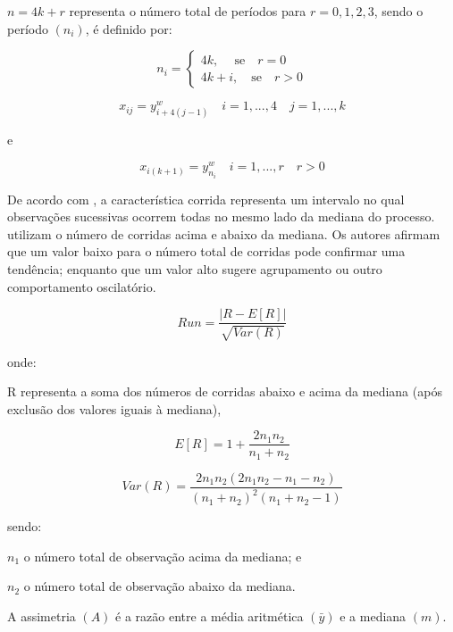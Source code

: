 \documentclass[11pt,letterpaper,twocolumn]{article}
\begin{document}
$n=4k+r$ representa o número total de períodos para $r = 0, 1, 2, 3$, sendo o período $(n_i)$, é definido por:

\begin{equation}
n_i = 
\begin{cases}
4k, \ \quad \mathrm{se} \quad r =0 \\
4k + i, \quad \mathrm{se} \quad r > 0
\end{cases}
\end{equation}

\begin{equation}
x_{ij} = y_{i+4(j-1)}^w \quad i = 1,...,4 \quad j=1,...,k
\end{equation}

e

\begin{equation}
x_{i(k+1)} = y_{n_i}^w \quad i = 1,...,r \quad r>0
\end{equation}

De acordo com \cite{BusingerRead1999}, a característica corrida representa um intervalo no qual observações sucessivas ocorrem todas no mesmo lado da mediana do processo. \cite{BusingerRead1999} utilizam o número de corridas acima e abaixo da mediana. Os autores afirmam que um valor baixo para o número total de corridas pode confirmar uma tendência; enquanto que um valor alto sugere agrupamento ou outro comportamento oscilatório.

\begin{equation}
Run = \frac{|R - E[R]|}{\sqrt{Var(R)}}
\end{equation}

onde: 

R representa a soma dos números de corridas abaixo e acima da mediana (após exclusão dos valores iguais à mediana),

\begin{equation}
E[R] = 1 + \frac{2n_1n_2}{n_1 + n_2}
\end{equation}

\begin{equation}
Var(R) = \frac{2n_1n_2(2n_1n_2 - n_1 - n_2)}{(n_1 + n_2)^2(n_1+n_2-1)}
\end{equation}

sendo:

$n_1$ o número total de observação acima da mediana; e

$n_2$ o número total de observação abaixo da mediana.

A assimetria $(A)$ é a razão entre a média aritmética $(\bar{y})$ e a mediana $(m)$.
\end{document}
